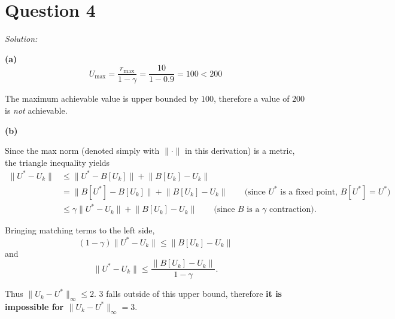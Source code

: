 \documentclass{article}
\theoremstyle{definition}
\newenvironment{solution}{\noindent\textit{Solution:}}{}
\begin{document}
\newpage
\section*{Question 4}
\begin{solution}

\textbf{(a)}
\[
U_{\max} = \frac{r_{\max}}{1-\gamma} = \frac{10}{1 - 0.9} = 100 < 200
\]

The maximum achievable value is upper bounded by $100$, therefore a value of $200$ is \emph{not} achievable.


\textbf{(b)}

Since the max norm (denoted simply with $\lVert \cdot \rVert$ in this derivation) is a metric, the triangle inequality yields
\begin{align}
    \lVert U^* - U_k \rVert &\leq \lVert U^* - B[U_k] \rVert + \lVert B[U_k] - U_k \rVert \\
                            &= \lVert B[U^*] - B[U_k] \rVert + \lVert B[U_k] - U_k \rVert \qquad \text{(since $U^*$ is a fixed point, $B[U^*] = U^*$)} \\
                            &\leq \gamma \lVert U^* - U_k \rVert + \lVert B[U_k] - U_k \rVert \qquad \text{(since $B$ is a $\gamma$ contraction).}
\end{align}

Bringing matching terms to the left side,
\[(1-\gamma) \lVert U^* - U_k \rVert  \leq \lVert B[U_k] - U_k \rVert\]
and
\[\lVert U^* - U_k \rVert  \leq \frac{\lVert B[U_k] - U_k \rVert}{1-\gamma} .\]


Thus $\|U_k - U^*\|_\infty \leq 2$. $3$ falls outside of this upper bound, therefore \textbf{it is impossible for $\|U_k - U^*\|_\infty = 3$}.


\end{solution}
\end{document}
